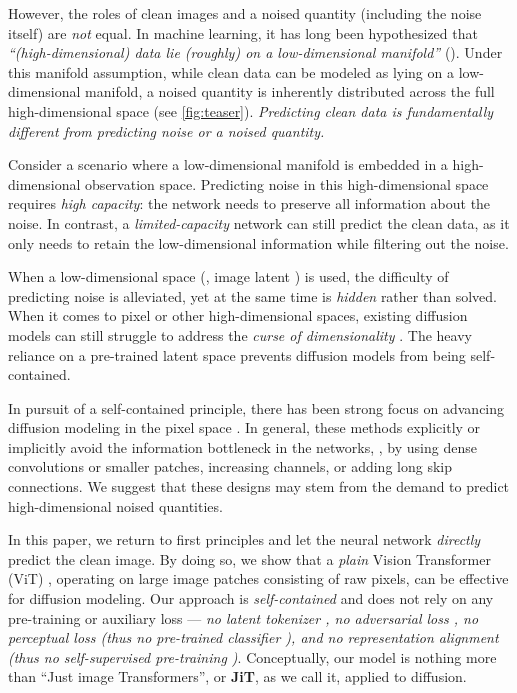 However, the roles of clean images and a noised quantity (including the noise itself) are \textit{not} equal.
In machine learning, it has long been hypothesized \cite{Chapelle2006SemiSupervised,carlsson2009topology} that
\textit{``(high-dimensional) data lie (roughly) on a low-dimensional manifold''} (\cite[p.6]{Chapelle2006SemiSupervised}).
Under this manifold assumption, while clean data can be modeled as lying on a low-dimensional manifold, a noised quantity is inherently distributed across the full high-dimensional space \cite{vincent2010stacked} (see \cref{fig:teaser}). \textit{Predicting clean data is fundamentally different from predicting noise or a noised quantity.}

Consider a scenario where a low-dimensional manifold is embedded in a high-dimensional observation space.
Predicting noise in this high-dimensional space requires \textit{high capacity}: the network needs to preserve all information about the noise.
In contrast, a \textit{limited-capacity} network can still predict the clean data, as it only needs to retain the low-dimensional information while filtering out the noise.

When a low-dimensional space (\eg, image latent \cite{Rombach2022}) is used, 
the difficulty of predicting noise is alleviated, yet at the same time is \textit{hidden} rather than solved.
When it comes to pixel or other high-dimensional spaces, existing diffusion models can still struggle to address the \textit{curse of dimensionality} \cite{Chapelle2006SemiSupervised}.
The heavy reliance on a pre-trained latent space  prevents diffusion models from being self-contained.

In pursuit of a self-contained principle, there has been strong focus on advancing diffusion modeling in the pixel space \cite{chen2023importance,hoogeboom2023simple,hoogeboom2024simpler,chen2025pixelflow,wang2025pixnerd}. 
In general, these methods explicitly or implicitly avoid the information bottleneck in the networks, \eg, by using dense convolutions or smaller patches, increasing channels, or adding long skip connections. 
We suggest that these designs may stem from the demand to predict high-dimensional noised quantities.

In this paper, we return to first principles and let the neural network \textit{directly} predict the clean image. By doing so, we show that a \textit{plain} Vision Transformer (ViT) \cite{Dosovitskiy2021}, operating on large image patches consisting of raw pixels, can  be effective for diffusion modeling.
Our approach is \textit{self-contained} and does not rely on any pre-training or auxiliary loss --- \textit{no latent tokenizer \cite{Rombach2022}, no adversarial loss \cite{goodfellow2014generative,Rombach2022}, no perceptual loss \cite{zhang2018unreasonable,Rombach2022} (thus no pre-trained classifier \cite{simonyan2014very}), and no representation alignment \cite{repa} (thus no self-supervised pre-training \cite{oquab2023dinov2})}. 
Conceptually, our model is nothing more than ``Just image Transformers'', or \textbf{JiT}, as we call it, applied to diffusion.

